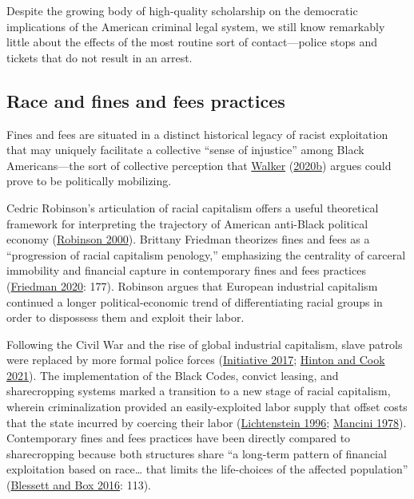 \documentclass[
  12pt,
]{article}
\begin{document}
Despite the growing body of high-quality scholarship on the democratic implications of the American criminal legal system, we still know remarkably little about the effects of the most routine sort of contact---police stops and tickets that do not result in an arrest.

\hypertarget{race-and-fines-and-fees-practices}{%
\subsection*{Race and fines and fees practices}\label{race-and-fines-and-fees-practices}}

Fines and fees are situated in a distinct historical legacy of racist exploitation that may uniquely facilitate a collective ``sense of injustice'' among Black Americans---the sort of collective perception that \protect\hyperlink{ref-Walker2020a}{Walker} (\protect\hyperlink{ref-Walker2020a}{2020b}) argues could prove to be politically mobilizing.

Cedric Robinson's articulation of racial capitalism offers a useful theoretical framework for interpreting the trajectory of American anti-Black political economy (\protect\hyperlink{ref-Robinson2000}{Robinson 2000}). Brittany Friedman theorizes fines and fees as a ``progression of racial capitalism penology,'' emphasizing the centrality of carceral immobility and financial capture in contemporary fines and fees practices (\protect\hyperlink{ref-Friedman2020}{Friedman 2020}: 177). Robinson argues that European industrial capitalism continued a longer political-economic trend of differentiating racial groups in order to dispossess them and exploit their labor.

Following the Civil War and the rise of global industrial capitalism, slave patrols were replaced by more formal police forces (\protect\hyperlink{ref-EqualJusticeInitiative2017}{Initiative 2017}; \protect\hyperlink{ref-Hinton2021}{Hinton and Cook 2021}). The implementation of the Black Codes, convict leasing, and sharecropping systems marked a transition to a new stage of racial capitalism, wherein criminalization provided an easily-exploited labor supply that offset costs that the state incurred by coercing their labor (\protect\hyperlink{ref-Lichtenstein1996}{Lichtenstein 1996}; \protect\hyperlink{ref-Mancini1978}{Mancini 1978}). Contemporary fines and fees practices have been directly compared to sharecropping because both structures share ``a long-term pattern of financial exploitation based on race\ldots{} that limits the life-choices of the affected population'' (\protect\hyperlink{ref-Blessett2016}{Blessett and Box 2016}: 113).
\end{document}
